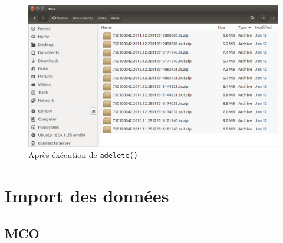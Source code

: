 \documentclass[
]{book}
\begin{document}
\begin{figure}
\centering
\includegraphics{images/archives_mco.png}
\caption{Après éxécution de \texttt{adelete()}}
\end{figure}

\hypertarget{import-des-donnuxe9es}{%
\chapter{Import des données}\label{import-des-donnuxe9es}}

\hypertarget{mco}{%
\section{MCO}\label{mco}}
\end{document}
